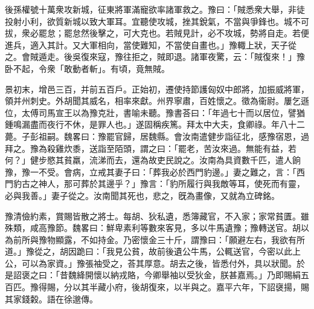 \begin{pinyinscope}
後孫權號十萬衆攻新城，征東將軍滿寵欲率諸軍救之。豫曰：「賊悉衆大舉，非徒投射小利，欲質新城以致大軍耳。宜聽使攻城，挫其銳氣，不當與爭鋒也。城不可拔，衆必罷怠；罷怠然後擊之，可大克也。若賊見計，必不攻城，勢將自走。若便進兵，適入其計。又大軍相向，當使難知，不當使自畫也。」豫輙上狀，天子從之。會賊遁走。後吳復來寇，豫往拒之，賊即退。諸軍夜驚，云：「賊復來！」豫卧不起，令衆「敢動者斬」。有頃，竟無賊。

景初末，增邑三百，并前五百戶。正始初，遷使持節護匈奴中郎將，加振威將軍，領并州刺史。外胡聞其威名，相率來獻。州界寧肅，百姓懷之。徵為衞尉。屢乞遜位，太傅司馬宣王以為豫克壯，書喻未聽。豫書荅曰：「年過七十而以居位，譬猶鍾鳴漏盡而夜行不休，是罪人也。」遂固稱疾篤。拜太中大夫，食卿祿。年八十二薨。子彭祖嗣。魏畧曰：豫罷官歸，居魏縣。會汝南遣健步詣征北，感豫宿恩，過拜之。豫為殺雞炊黍，送詣至陌頭，謂之曰：「罷老，苦汝來過。無能有益，若何？」健步愍其貧羸，流涕而去，還為故吏民說之。汝南為具資數千匹，遣人餉豫，豫一不受。會病，立戒其妻子曰：「葬我必於西門豹邊。」妻之難之，言：「西門豹古之神人，那可葬於其邊乎？」豫言：「豹所履行與我敵等耳，使死而有靈，必與我善。」妻子從之。汝南聞其死也，悲之，旣為畫像，又就為立碑銘。

豫清儉約素，賞賜皆散之將士。每胡、狄私遺，悉簿藏官，不入家；家常貧匱。雖殊類，咸高豫節。魏畧曰：鮮卑素利等數來客見，多以牛馬遺豫；豫轉送官。胡以為前所與豫物顯露，不如持金。乃密懷金三十斤，謂豫曰：「願避左右，我欲有所道。」豫從之，胡因跪曰：「我見公貧，故前後遺公牛馬，公輒送官，今密以此上公，可以為家資。」豫張袖受之，荅其厚意。胡去之後，皆悉付外，具以狀聞。於是詔褒之曰：「昔魏絳開懷以納戎賂，今卿舉袖以受狄金，朕甚嘉焉。」乃即賜絹五百匹。豫得賜，分以其半藏小府，後胡復來，以半與之。嘉平六年，下詔襃揚，賜其家錢糓。語在徐邈傳。


\end{pinyinscope}